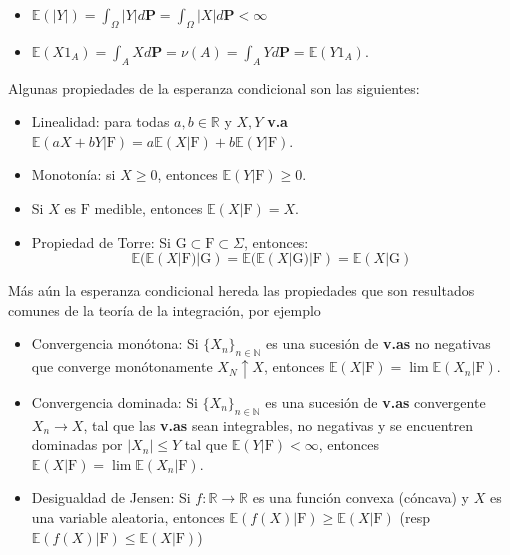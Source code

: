 \documentclass[letterpaper]{article}
\newcommand{\nat}{\ensuremath{ \mathbb N }}
\newcommand{\esp}{\mathbb E}
\newcommand{\om}{\ensuremath{\Omega}}
\newcommand{\sig}{\ensuremath{\Sigma}}
\newcommand{\re}{\ensuremath{\mathbb R }}
\begin{document}
\begin{itemize}
\item \(\esp(|Y|)=\int_{\om}|Y|d\textbf{P}=\int_{\om}|X|d\textbf{P}<\infty\)
\item \(\esp(X1_A)=\int_{A}Xd\textbf{P}=\nu(A)=\int_{A}Yd\textbf{P}=\esp(Y1_A)\).
\end{itemize}

Algunas propiedades de la esperanza condicional son las siguientes:

\begin{itemize}
\item Linealidad: para todas \(a,b\in\re\) y \(X,Y\) \textbf{v.a} \(\esp(aX+bY|\mathrm{F})=a\esp(X|\mathrm{F})+b\esp(Y|\mathrm{F})\).
\item Monotonía: si \(X\geq0\), entonces \(\esp(Y|\mathrm{F})\geq 0\).
\item Si \(X\) es \(\mathrm{F}\) medible, entonces \(\esp(X|\mathrm{F})=X\).
\item Propiedad de Torre: Si \(\mathrm{G}\subset\mathrm{F}\subset\sig\), entonces:
\[
        \esp(\esp(X|\mathrm{F})|\mathrm{G})=\esp(\esp(X|\mathrm{G})|\mathrm{F})=\esp(X|\mathrm{G})
  \]
\end{itemize}

Más aún la esperanza condicional hereda las propiedades que son resultados comunes de la teoría de la integración, por ejemplo
\begin{itemize}
\item Convergencia monótona: Si \(\{X_n\}_{n\in\nat}\) es una sucesión de \textbf{v.as} no negativas que converge monótonamente \(X_N\uparrow X\), entonces \(\esp(X|\mathrm{F})=\lim\esp(X_n|\mathrm{F})\).
\item Convergencia dominada: Si \(\{X_n\}_{n\in\nat}\) es una sucesión de \textbf{v.as} convergente \(X_n\rightarrow X\), tal que las \textbf{v.as} sean integrables, no negativas y se encuentren dominadas por \(|X_n|\leq Y\) tal que \(\esp(Y|\mathrm{F})<\infty\),  entonces \(\esp(X|\mathrm{F})=\lim\esp(X_n|\mathrm{F})\).
\item Desigualdad de Jensen: Si \(f:\re\rightarrow\re\) es una función convexa (cóncava) y \(X\) es una variable aleatoria, entonces \(\esp(f(X)|\mathrm{F})\geq\esp(X|\mathrm{F})\) (resp \(\esp(f(X)|\mathrm{F})\leq\esp(X|\mathrm{F})\))
\end{itemize}
\end{document}
